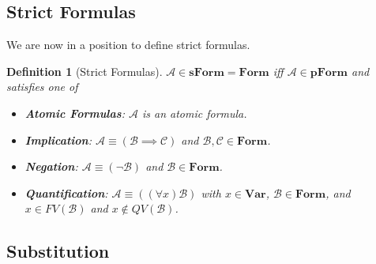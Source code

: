 \documentclass[12pt]{article}
\theoremstyle{break}
\newtheorem{definition}{Definition}[section]
\theoremstyle{break}
\theoremstyle{break}
\theoremstyle{break}
\newcommand{\mc}[1]{\mathcal{#1}}
\begin{document}
\subsection{Strict Formulas}

We are now in a position to define strict formulas.
\begin{definition}[Strict Formulas]
$\mc{A}\in\textbf{sForm} = \textbf{Form}$ iff $\mc{A} \in \textbf{pForm}$ and satisfies one of
\begin{itemize}
\item{\textbf{Atomic Formulas}: $\mc{A}$ is an atomic formula.}
\item{\textbf{Implication}: $\mc{A} \equiv (\mc{B} \implies \mc{C})$ and $\mc{B}, \mc{C} \in \textbf{Form}$.}
\item{\textbf{Negation}: $\mc{A} \equiv (\lnot \mc{B})$ and $\mc{B}\in\textbf{Form}$.}
\item{\textbf{Quantification}: $\mc{A} \equiv ((\forall x)\mc{B})$ with $x\in\textbf{Var}$, $\mc{B}\in\textbf{Form}$, and $x\in FV(\mc{B})$ and $x\not\in QV(\mc{B})$.}
\end{itemize}
\end{definition}


\subsection{Substitution}
\end{document}
